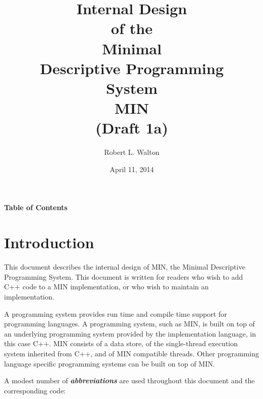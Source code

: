 \documentclass[12pt]{article}
\makeatletter
\renewcommand\tableofcontents{%
    \begin{list}{}%
	     {\setlength{\itemsep}{0in}%
	      \setlength{\topsep}{0in}%
	      \setlength{\parsep}{1ex}%
	      \setlength{\labelwidth}{0in}%
	      \setlength{\baselineskip}{1.5ex}%
	      \setlength{\leftmargin}{0.8in}%
	      \setlength{\rightmargin}{0.8in}}%
    \item\@starttoc{toc}%
    \end{list}}
\newcommand{\skey}[2]{{\bf \em #1#2}\index{#1}}
\makeatother
\begin{document}
        
\title{Internal Design\\[2ex]of the\\[2ex]
       Minimal\\Descriptive Programming\\System\\[2ex]MIN\\[2ex]
       (Draft 1a)}

\author{Robert L. Walton}

\date{April 11, 2014}
 
\maketitle

\newpage
\begin{center}
\large \bf Table of Contents
\end{center}

\bigskip

\tableofcontents 

\newpage

\section{Introduction}

This document describes the internal design of MIN,
the Minimal Descriptive Programming System.
This document is written for readers who wish to add C++ code
to a MIN implementation, or who wish to maintain an implementation.

A programming system provides run time and compile time support
for programming languages.
A programming system, such as MIN, is
built on top of an underlying programming system provided by the
implementation language, in this case C++.
MIN consists of a data store, of the single-thread execution system
inherited from C++, and of MIN compatible threads.
Other programming language specific
programming systems can be built on top of MIN.

A modest number of \skey{abbreviation}s are used throughout this document
and the corresponding code:
\end{document}
